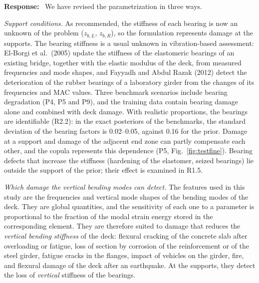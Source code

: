 \documentclass[11pt]{article}
\newenvironment{response}{\par\smallskip\noindent\color{resp}\textbf{Response:}\ }{\par}
\begin{document}
\begin{response}
We have revised the parametrization in three ways.

\textit{Support conditions.} As recommended, the stiffness of each bearing is now an unknown of the problem
($z_{b,L}$, $z_{b,R}$), so the formulation represents damage at the supports. The bearing stiffness is a usual unknown in
vibration-based assessment: El-Borgi et al.\ (2005) update the stiffness of the elastomeric bearings of an existing
bridge, together with the elastic modulus of the deck, from measured frequencies and mode shapes, and Fayyadh and Abdul
Razak (2012) detect the deterioration of the rubber bearings of a laboratory girder from the changes of its frequencies
and MAC
values. Three benchmark scenarios include bearing
degradation (P4, P5 and P9), and the training data contain bearing damage alone and combined with deck damage. With
realistic proportions, the bearings are identifiable (R2.2): in the exact posteriors of the benchmarks, the standard
deviation of the bearing factors is 0.02--0.05, against 0.16 for the prior. Damage at a support and damage of the
adjacent end zone can partly compensate each other, and the copula represents this dependence (P5,
Fig.~\ref{fig:testfine}). Bearing defects that increase the stiffness (hardening of the elastomer, seized bearings) lie
outside the support of the prior; their effect is examined in R1.5.

\textit{Which damage the vertical bending modes can detect.} The features used in this study are the frequencies and
vertical mode shapes of the bending modes of the deck. They are global quantities, and the sensitivity of each one to a
parameter is proportional to the fraction of the modal strain energy stored in the corresponding element. They are
therefore suited to damage that reduces the \emph{vertical bending stiffness} of the deck: flexural cracking of the
concrete slab after overloading or fatigue, loss of section by corrosion of the reinforcement or of the steel girder,
fatigue cracks in the flanges, impact of vehicles on the girder, fire, and flexural damage of the deck after an
earthquake. At the supports, they detect the loss of \emph{vertical} stiffness of the bearings.


\end{response}
\end{document}
